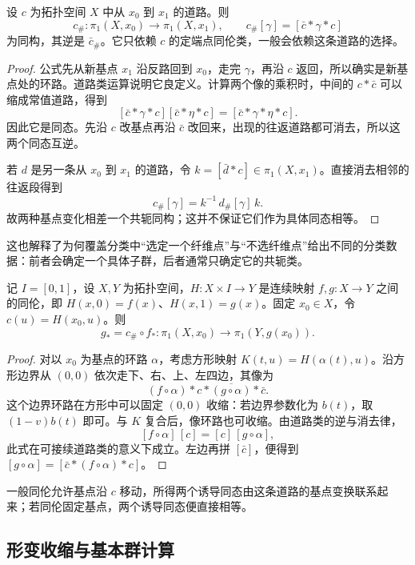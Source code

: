 \begin{proposition}\label{g1:prop:basepoint-change}
	设 \(c\) 为拓扑空间 \(X\) 中从 \(x_0\) 到 \(x_1\) 的道路。则
	\[
		c_\#:\pi_1(X,x_0)\longrightarrow\pi_1(X,x_1),\qquad
		c_\#[\gamma]=[\bar c*\gamma*c]
	\]
	为同构，其逆是 \(\bar c_\#\)。它只依赖 \(c\) 的定端点同伦类，一般会依赖这条道路的选择。
\end{proposition}
\begin{proof}
	公式先从新基点 \(x_1\) 沿反路回到 \(x_0\)，走完 \(\gamma\)，再沿 \(c\) 返回，所以确实是新基点处的环路。道路类运算说明它良定义。计算两个像的乘积时，中间的 \(c*\bar c\) 可以缩成常值道路，得到
	\[
		[\bar c*\gamma*c][\bar c*\eta*c]=[\bar c*\gamma*\eta*c].
	\]
	因此它是同态。先沿 \(c\) 改基点再沿 \(\bar c\) 改回来，出现的往返道路都可消去，所以这两个同态互逆。

	若 \(d\) 是另一条从 \(x_0\) 到 \(x_1\) 的道路，令 \(k=[\bar d*c]\in\pi_1(X,x_1)\)。直接消去相邻的往返段得到
	\[
		c_\#[\gamma]=k^{-1}\,d_\#[\gamma]\,k.
	\]
	故两种基点变化相差一个共轭同构；这并不保证它们作为具体同态相等。
\end{proof}

这也解释了为何覆盖分类中“选定一个纤维点”与“不选纤维点”给出不同的分类数据：前者会确定一个具体子群，后者通常只确定它的共轭类。

\begin{proposition}\label{g1:prop:moving-basepoint}
	记 \(I=[0,1]\)，设 \(X,Y\) 为拓扑空间，\(H:X\times I\rightarrow Y\) 是连续映射 \(f,g:X\rightarrow Y\) 之间的同伦，即 \(H(x,0)=f(x)\)、\(H(x,1)=g(x)\)。固定 \(x_0\in X\)，令 \(c(u)=H(x_0,u)\)。则
	\[
		g_*=c_\#\circ f_*:\pi_1(X,x_0)\longrightarrow\pi_1(Y,g(x_0)).
	\]
\end{proposition}
\begin{proof}
	对以 \(x_0\) 为基点的环路 \(\alpha\)，考虑方形映射 \(K(t,u)=H(\alpha(t),u)\)。沿方形边界从 \((0,0)\) 依次走下、右、上、左四边，其像为
	\[
		(f\circ\alpha)*c*\overline{(g\circ\alpha)}*\bar c.
	\]
	这个边界环路在方形中可以固定 \((0,0)\) 收缩：若边界参数化为 \(b(t)\)，取 \((1-v)b(t)\) 即可。与 \(K\) 复合后，像环路也可收缩。由道路类的逆与消去律，
	\[
		[f\circ\alpha]\,[c]=[c]\,[g\circ\alpha],
	\]
	此式在可接续道路类的意义下成立。左边再拼 \([\bar c]\)，便得到 \([g\circ\alpha]=[\bar c*(f\circ\alpha)*c]\)。
\end{proof}

一般同伦允许基点沿 \(c\) 移动，所得两个诱导同态由这条道路的基点变换联系起来；若同伦固定基点，两个诱导同态便直接相等。

\subsection{形变收缩与基本群计算}
\label{g1:subsec:0501:03}

